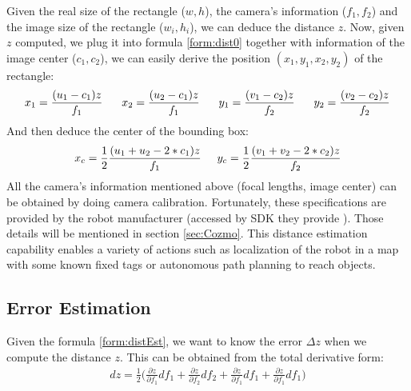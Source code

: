 Given the real size of the rectangle ($w, h$), the camera's information ($f_1, f_2$) and the image size of the rectangle ($w_i, h_i$), we can deduce the distance $z$. Now, given $z$ computed, we plug it into formula \ref{form:dist0} together with information of the image center ($c_1, c_2$), we can easily derive the position $(x_1, y_1, x_2, y_2)$ of the rectangle:
\begin{align}
	x_1 = \frac{(u_1 - c_1)z}{f_1} \hspace{0.6cm}
	x_2 = \frac{(u_2 - c_1)z}{f_1} \hspace{0.6cm}
	y_1 = \frac{(v_1 - c_2)z}{f_2} \hspace{0.6cm}
	y_2 = \frac{(v_2 - c_2)z}{f_2} 
\end{align}
And then deduce the center of the bounding box:
\begin{align}
	\label{form:centerIm}
x_c = \frac{1}{2}\frac{(u_1 + u_2 - 2 * c_1)z}{f_1} \hspace{0.5cm} y_c = \frac{1}{2}\frac{(v_1 + v_2 - 2*c_2)z}{f_2}
\end{align}
All the camera's information mentioned above (focal lengths, image center) can be obtained by doing camera calibration. Fortunately, these specifications are provided by the robot manufacturer (accessed by SDK they provide \cite{ANKI:2017}). Those details will be mentioned in section \ref{sec:Cozmo}.
This distance estimation capability enables a variety of actions such as localization of the robot in a map with some known fixed tags or autonomous path planning to reach objects.
\subsection{Error Estimation}
Given the formula \ref{form:distEst}, we want to know the error $\Delta z$ when we compute the distance $z$. This can be obtained from the total derivative form:
\begin{align*}
dz = \frac{1}{2} \bigg( \frac{\partial z}{\partial f_1}df_1 + \frac{\partial z}{\partial f_2}df_2 + \frac{\partial z}{\partial f_1}df_1 + \frac{\partial z}{\partial f_1}df_1     \bigg)
\end{align*}